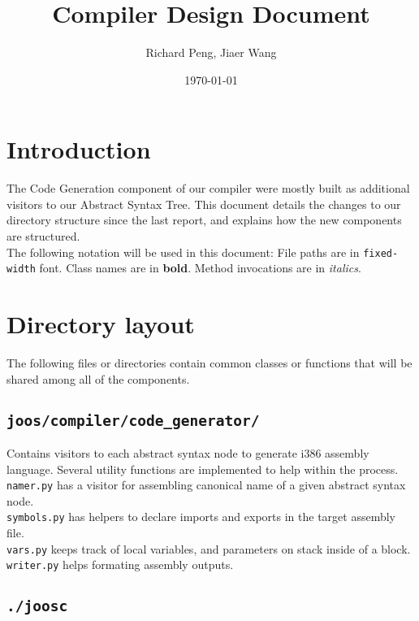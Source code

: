 \documentclass[12pt, a4paper]{article}
\title{Compiler Design Document}
\date{\today}
\author{Richard Peng, Jiaer Wang}
\newcommand{\class}{\textbf}
\newcommand{\fpath}{\verb}
\begin{document}
\maketitle

\section{Introduction}

The Code Generation component of our compiler were mostly built as additional visitors to our Abstract Syntax Tree. This document details the changes to our directory structure since the last report, and explains how the new components are structured. \\

The following notation will be used in this document: File paths are in \fpath|fixed-width| font. Class names are in \class{bold}. Method invocations are in \textit{italics}.

\section{Directory layout}

The following files or directories contain common classes or functions that will be shared among all of the components.

\subsection{\texttt{joos/compiler/code\_generator/}}

Contains visitors to each abstract syntax node to generate i386 assembly language. Several utility functions are implemented to help within the process. \\

\verb|namer.py| has a visitor for assembling canonical name of a given abstract syntax node. \\

\verb|symbols.py| has helpers to declare imports and exports in the target assembly file. \\

\verb|vars.py| keeps track of local variables, and parameters on stack inside of a block. \\

\verb|writer.py| helps formating assembly outputs.


\subsection{\texttt{./joosc}}
\end{document}
